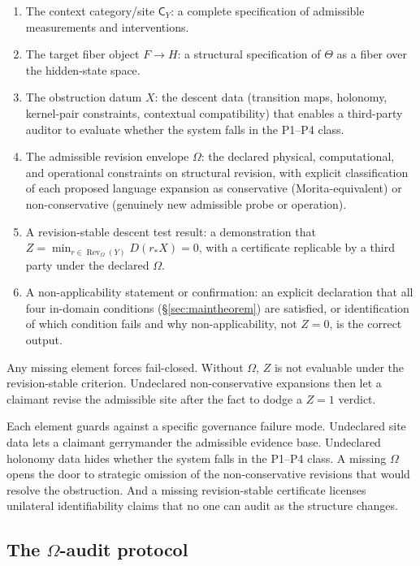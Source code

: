 \documentclass[11pt]{article}
\begin{document}
\begin{enumerate}
\item The context category/site $\mathsf{C}_Y$: a complete specification of
  admissible measurements and interventions.
\item The target fiber object $F \to H$: a structural specification of
  $\Theta$ as a fiber over the hidden-state space.
\item The obstruction datum $X$: the descent data (transition maps, holonomy,
  kernel-pair constraints, contextual compatibility) that enables a
  third-party auditor to evaluate whether the system falls in the P1--P4
  class.
\item The admissible revision envelope $\Omega$: the declared physical,
  computational, and operational constraints on structural revision, with
  explicit classification of each proposed language expansion as conservative
  (Morita-equivalent) or non-conservative (genuinely new admissible probe or
  operation).
\item A revision-stable descent test result: a demonstration that
  $Z = \min_{r \in \operatorname{Rev}_\Omega(Y)} D(r_* X) = 0$, with a
  certificate replicable by a third party under the declared $\Omega$.
\item A non-applicability statement or confirmation: an explicit declaration
  that all four in-domain conditions (\S\ref{sec:maintheorem}) are satisfied,
  or identification of which condition fails and why non-applicability, not
  $Z = 0$, is the correct output.
\end{enumerate}

Any missing element forces fail-closed. Without $\Omega$, $Z$ is not evaluable
under the revision-stable criterion. Undeclared non-conservative expansions then
let a claimant revise the admissible site after the fact to dodge a $Z = 1$
verdict.

Each element guards against a specific governance failure mode. Undeclared site
data lets a claimant gerrymander the admissible evidence base. Undeclared
holonomy data hides whether the system falls in the P1--P4 class. A missing
$\Omega$ opens the door to strategic omission of the non-conservative revisions
that would resolve the obstruction. And a missing revision-stable certificate
licenses unilateral identifiability claims that no one can audit as the
structure changes.

\subsection{\texorpdfstring{The $\Omega$-audit protocol}{The Omega-audit protocol}}
\label{sec:omega-audit}
\end{document}
